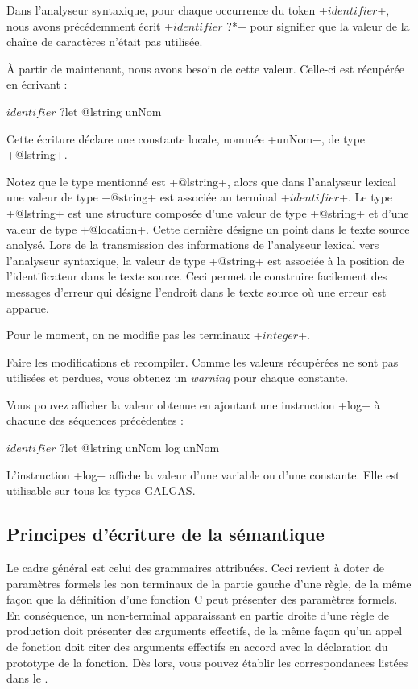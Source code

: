Dans l’analyseur syntaxique, pour chaque occurrence du token \ggs+$identifier$+, nous avons précédemment écrit \ggs+$identifier$ ?*+ pour signifier que la valeur de la chaîne de caractères n’était pas utilisée.

À partir de maintenant, nous avons besoin de cette valeur. Celle-ci est récupérée en écrivant :

\begin{galgas}
$identifier$ ?let @lstring unNom
\end{galgas}


Cette écriture déclare une constante locale, nommée \ggs+unNom+, de type \ggs+@lstring+.

Notez que le type mentionné est \ggs+@lstring+, alors que dans l’analyseur lexical une valeur de type \ggs+@string+ est associée au terminal \ggs+$identifier$+. Le type \ggs+@lstring+ est une structure composée d’une valeur de type \ggs+@string+ et d’une valeur de type \ggs+@location+. Cette dernière désigne un point dans le texte source analysé. Lors de la transmission des informations de l’analyseur lexical vers l’analyseur syntaxique, la valeur de type \ggs+@string+ est associée à la position de l’identificateur dans le texte source. Ceci permet de construire facilement des messages d’erreur qui désigne l’endroit dans le texte source où une erreur est apparue.

Pour le moment, on ne modifie pas les terminaux \ggs+$integer$+.

Faire les modifications et recompiler. Comme les valeurs récupérées ne sont pas utilisées et perdues, vous obtenez un \emph{warning} pour chaque constante.

Vous pouvez afficher la valeur obtenue en ajoutant une instruction \ggs+log+ à chacune des séquences précédentes :
\begin{galgas}
$identifier$ ?let @lstring unNom
log unNom
\end{galgas}

L'instruction \ggs+log+ affiche la valeur d'une variable ou d’une constante. Elle est utilisable sur tous les types GALGAS.

\subsection{Principes d'écriture de la sémantique}

Le cadre général est celui des grammaires attribuées. Ceci revient à doter de paramètres formels les non terminaux de la partie gauche d'une règle, de la même façon que la définition d'une fonction C peut présenter des paramètres formels. En conséquence, un non-terminal apparaissant en partie droite d'une règle de production doit présenter des arguments effectifs, de la même façon qu'un appel de fonction doit citer des arguments effectifs en accord avec la déclaration du prototype de la fonction. Dès lors, vous pouvez établir les correspondances listées dans le .


